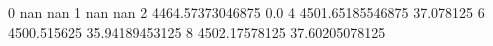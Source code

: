 0 nan nan
1 nan nan
2 4464.57373046875 0.0
4 4501.65185546875 37.078125
6 4500.515625 35.94189453125
8 4502.17578125 37.60205078125
